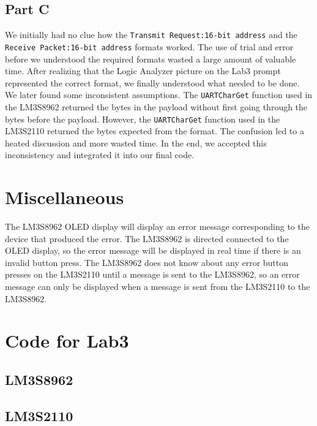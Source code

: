 \documentclass[11pt, titlepage]{article}
\begin{document}
        \subsection{Part C}
            We initially had no clue how the \texttt{Transmit Request:16-bit address} and the \texttt{Receive Packet:16-bit address} formats worked. The use of trial and error before we understood the required formats wasted a large amount of valuable time. After realizing that the Logic Analyzer picture on the Lab3 prompt represented the correct format, we finally understood what needed to be done. We later found some inconsistent assumptions. The \texttt{UARTCharGet} function used in the LM3S8962 returned the bytes in the payload without first going through the bytes before the payload. However, the \texttt{UARTCharGet} function used in the LM3S2110 returned the bytes expected from the format. The confusion led to a heated discussion and more wasted time. In the end, we accepted this inconsistency and integrated it into our final code.
            
    \section{Miscellaneous}
        The LM3S8962 OLED display will display an error message corresponding to the device that produced the error. The LM3S8962 is directed connected to the OLED display, so the error message will be displayed in real time if there is an invalid button press. The LM3S8962 does not know about any error button presses on the LM3S2110 until a message is sent to the LM3S8962, so an error message can only be displayed when a message is sent from the LM3S2110 to the LM3S8962.
    
    \appendix
    \section{Code for Lab3}
        \subsection{LM3S8962}
            
        \subsection{LM3S2110}
            
\end{document}
